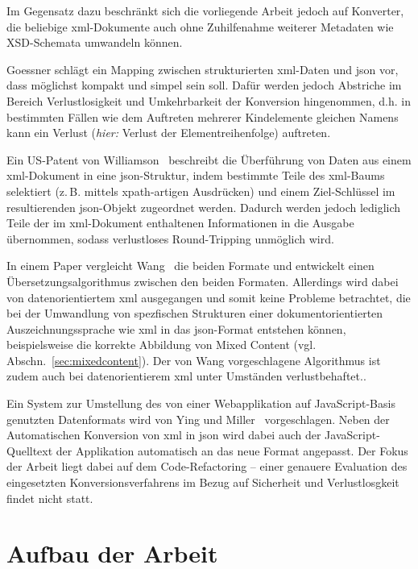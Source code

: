 Im Gegensatz dazu beschränkt sich die vorliegende Arbeit jedoch auf Konverter, die beliebige \acrshort{xml}-Dokumente auch ohne Zuhilfenahme weiterer Metadaten wie XSD-Schemata umwandeln können.

Goessner schlägt ein Mapping zwischen strukturierten \acrshort{xml}-Daten und \acrshort{json} vor, dass möglichst kompakt und simpel sein soll. Dafür werden jedoch Abstriche im Bereich Verlustlosigkeit und Umkehrbarkeit der Konversion hingenommen, d.h. in bestimmten Fällen wie dem Auftreten mehrerer Kindelemente gleichen Namens kann ein Verlust (\emph{hier:} Verlust der Elementreihenfolge) auftreten.~\cite{goessner2006converting}

Ein US-Patent von Williamson~\cite{US20140244692} beschreibt die Überführung von Daten aus einem \acrshort{xml}-Dokument in eine \acrshort{json}-Struktur, indem bestimmte Teile des \acrshort{xml}-Baums selektiert (z.\,B. mittels \acrshort{xpath}-artigen Ausdrücken) und einem Ziel-Schlüssel im resultierenden \acrshort{json}-Objekt zugeordnet werden. Dadurch werden jedoch lediglich Teile der im \acrshort{xml}-Dokument enthaltenen Informationen in die Ausgabe übernommen, sodass verlustloses Round-Tripping unmöglich wird.

In einem Paper vergleicht Wang~\cite{wang2011improving} die beiden Formate und entwickelt einen Übersetzungsalgorithmus zwischen den beiden Formaten. Allerdings wird dabei von datenorientiertem \acrshort{xml} ausgegangen und somit keine Probleme betrachtet, die bei der Umwandlung von spezfischen Strukturen einer dokumentorientierten Auszeichnungssprache wie \acrshort{xml} in das \acrshort{json}-Format entstehen können, beispielsweise die korrekte Abbildung von Mixed Content (vgl. Abschn.~\ref{sec:mixedcontent}). Der von Wang vorgeschlagene Algorithmus ist zudem auch bei datenorientierem \acrshort{xml} unter Umständen verlustbehaftet.\cite[S.~184]{wang2011improving}.

Ein System zur Umstellung des von einer Webapplikation auf JavaScript-Basis genutzten Datenformats wird von Ying und Miller~\cite{ying2013refactoring} vorgeschlagen. Neben der Automatischen Konversion von \acrshort{xml} in \acrshort{json} wird dabei auch der JavaScript-Quelltext der Applikation automatisch an das neue Format angepasst. Der Fokus der Arbeit liegt dabei auf dem Code-Refactoring -- einer genauere Evaluation des eingesetzten Konversionsverfahrens im Bezug auf Sicherheit und Verlustlosgkeit findet nicht statt.

\section{Aufbau der Arbeit}
\label{sec:structure}

